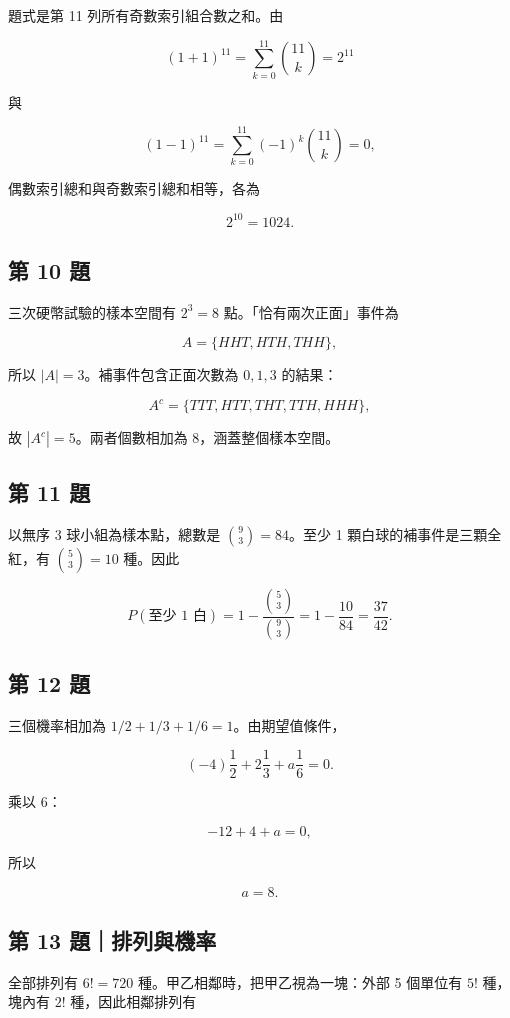 \documentclass[11pt,a4paper]{article}
\begin{document}
題式是第 11 列所有奇數索引組合數之和。由

\[
(1+1)^{11}=\sum_{k=0}^{11}\binom{11}{k}=2^{11}
\]

與

\[
(1-1)^{11}=\sum_{k=0}^{11}(-1)^k\binom{11}{k}=0,
\]

偶數索引總和與奇數索引總和相等，各為

\[
2^{10}=1024.
\]

\subsection{第 10 題}\label{ux7b2c-10-ux984c}

三次硬幣試驗的樣本空間有 \(2^3=8\) 點。「恰有兩次正面」事件為

\[
A=\{HHT,HTH,THH\},
\]

所以 \(|A|=3\)。補事件包含正面次數為 \(0,1,3\) 的結果：

\[
A^c=\{TTT,HTT,THT,TTH,HHH\},
\]

故 \(|A^c|=5\)。兩者個數相加為 8，涵蓋整個樣本空間。

\subsection{第 11 題}\label{ux7b2c-11-ux984c}

以無序 3 球小組為樣本點，總數是 \(\binom93=84\)。至少 1 顆白球的補事件是三顆全紅，有 \(\binom53=10\) 種。因此

\[
P(\text{至少 1 白})
=1-\frac{\binom53}{\binom93}
=1-\frac{10}{84}
=\frac{37}{42}.
\]

\subsection{第 12 題}\label{ux7b2c-12-ux984c}

三個機率相加為 \(1/2+1/3+1/6=1\)。由期望值條件，

\[
(-4)\frac12+2\frac13+a\frac16=0.
\]

乘以 6：

\[
-12+4+a=0,
\]

所以

\[
\boxed{a=8}.
\]

\subsection{第 13 題｜排列與機率}\label{ux7b2c-13-ux984cux6392ux5217ux8207ux6a5fux7387}

全部排列有 \(6!=720\) 種。甲乙相鄰時，把甲乙視為一塊：外部 5 個單位有 \(5!\) 種，塊內有 \(2!\) 種，因此相鄰排列有
\end{document}
